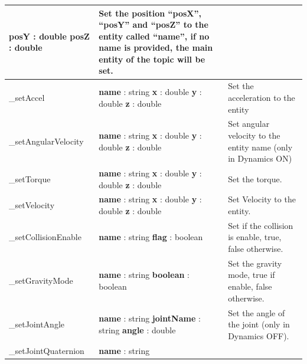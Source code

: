 \documentclass[notitlepage]{report}
\begin{document}
\begin{supertabular}{|p{2.9cm}|p{4.5cm}|p{7cm}|}
  		\textbf{posY} : double \newline
  		\textbf{posZ} : double
  		& Set the position ``posX'', ``posY'' and ``posZ'' to the entity called ``name'', if no name is provided, the main entity of the topic will be set.\\
  	\hline
  	\_setAccel & 
  		\textbf{name} : string \newline
  		\textbf{x} : double \newline
  		\textbf{y} : double \newline
  		\textbf{z} : double
  		& Set the acceleration to the entity\\
  	\hline
  	\_setAngularVelocity & 
  		\textbf{name} : string \newline
  		\textbf{x} : double \newline
  		\textbf{y} : double \newline
  		\textbf{z} : double
  		& Set angular velocity to the entity name (only in Dynamics ON)\\
  	\hline
  	\_setTorque & 
  		\textbf{name} : string \newline
  		\textbf{x} : double \newline
  		\textbf{y} : double \newline
  		\textbf{z} : double
  		& Set the torque.\\
  	\hline
  	\_setVelocity & 
  		\textbf{name} : string \newline
  		\textbf{x} : double \newline
  		\textbf{y} : double \newline
  		\textbf{z} : double
  		& Set Velocity to the entity.\\
  	\hline
  	\_setCollisionEnable & 
  		\textbf{name} : string \newline
  		\textbf{flag} : boolean
  		& Set if the collision is enable, true, false otherwise.\\
  	\hline
  	\_setGravityMode & 
  		\textbf{name} : string \newline
  		\textbf{boolean} : boolean
  		& Set the gravity mode, true if enable, false otherwise.\\
  	\hline
  	\_setJointAngle & 
  		\textbf{name} : string \newline
  		\textbf{jointName} : string \newline
  		\textbf{angle} : double
  		& Set the angle of the joint (only in Dynamics OFF).\\
  	\hline
  	\_setJointQuaternion & 
  		\textbf{name} : string \newline

\end{supertabular}
\end{document}
